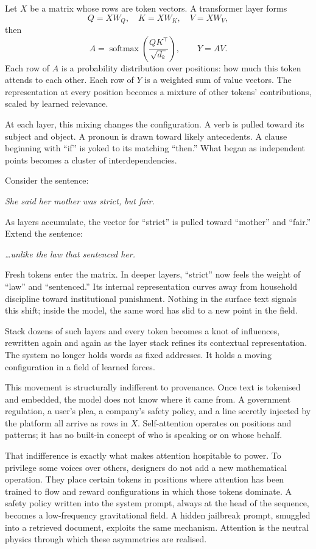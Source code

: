 \documentclass[12pt,a4paper]{article}
\begin{document}
\begin{formalbox}[title={Self-Attention as Contextual Weighing}]
Let $X$ be a matrix whose rows are token vectors. A transformer layer forms
\[
Q = XW_Q,\quad K = XW_K,\quad V = XW_V,
\]
then
\[
A = \operatorname{softmax}\!\left(\frac{QK^\top}{\sqrt{d_k}}\right),\qquad Y = AV.
\]
Each row of $A$ is a probability distribution over positions: how much this token attends to each other. Each row of $Y$ is a weighted sum of value vectors. The representation at every position becomes a mixture of other tokens' contributions, scaled by learned relevance.
\end{formalbox}

At each layer, this mixing changes the configuration. A verb is pulled toward its subject and object. A pronoun is drawn toward likely antecedents. A clause beginning with ``if'' is yoked to its matching ``then.'' What began as independent points becomes a cluster of interdependencies.

Consider the sentence:

\medskip
\noindent\emph{She said her mother was strict, but fair.}
\medskip

As layers accumulate, the vector for ``strict'' is pulled toward ``mother'' and ``fair.'' Extend the sentence:

\medskip
\noindent\emph{\ldots unlike the law that sentenced her.}
\medskip

Fresh tokens enter the matrix. In deeper layers, ``strict'' now feels the weight of ``law'' and ``sentenced.'' Its internal representation curves away from household discipline toward institutional punishment. Nothing in the surface text signals this shift; inside the model, the same word has slid to a new point in the field.

Stack dozens of such layers and every token becomes a knot of influences, rewritten again and again as the layer stack refines its contextual representation. The system no longer holds words as fixed addresses. It holds a moving configuration in a field of learned forces.

This movement is structurally indifferent to provenance. Once text is tokenised and embedded, the model does not know where it came from. A government regulation, a user's plea, a company's safety policy, and a line secretly injected by the platform all arrive as rows in $X$. Self-attention operates on positions and patterns; it has no built-in concept of who is speaking or on whose behalf.

That indifference is exactly what makes attention hospitable to power. To privilege some voices over others, designers do not add a new mathematical operation. They place certain tokens in positions where attention has been trained to flow and reward configurations in which those tokens dominate. A safety policy written into the system prompt, always at the head of the sequence, becomes a low-frequency gravitational field. A hidden jailbreak prompt, smuggled into a retrieved document, exploits the same mechanism. Attention is the neutral physics through which these asymmetries are realised.
\end{document}
